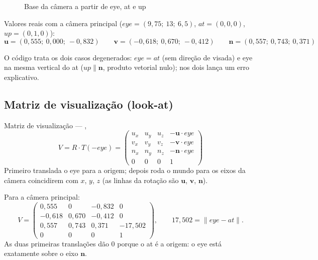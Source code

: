 \documentclass[11pt,a4paper]{article}
\newcommand{\code}[1]{\texttt{\detokenize{#1}}}
\newcommand{\vetor}[1]{\mathbf{#1}}
\newcommand{\norm}[1]{\left\lVert #1 \right\rVert}
\begin{document}
\begin{figure}[H]\centering
\caption{Base da câmera a partir de eye, at e up}
\end{figure}

Valores reais com a câmera principal ($eye = (9{,}75;\ 13;\ 6{,}5)$, $at = (0,0,0)$, $up = (0,1,0)$):
\[
\vetor u = (0{,}555;\ 0{,}000;\ -0{,}832) \qquad
\vetor v = (-0{,}618;\ 0{,}670;\ -0{,}412) \qquad
\vetor n = (0{,}557;\ 0{,}743;\ 0{,}371)
\]

O código trata os dois casos degenerados: $eye = at$ (sem direção de visada) e eye na mesma vertical do
at ($up \parallel \vetor n$, produto vetorial nulo); nos dois lança um erro explicativo.

\subsection{Matriz de visualização (look-at)}

\begin{conceito}{Matriz de visualização — \code{look_at}, \code{math_3d.py:119}}
\[
V = R \cdot T(-eye) =
\begin{pmatrix}
u_x & u_y & u_z & -\vetor u\cdot eye\\
v_x & v_y & v_z & -\vetor v\cdot eye\\
n_x & n_y & n_z & -\vetor n\cdot eye\\
0&0&0&1
\end{pmatrix}
\]
Primeiro translada o eye para a origem; depois roda o mundo para os eixos da câmera coincidirem com
$x$, $y$, $z$ (as linhas da rotação são $\vetor u$, $\vetor v$, $\vetor n$).
\end{conceito}

Para a câmera principal:
\[
V = \begin{pmatrix}
0{,}555 & 0 & -0{,}832 & 0\\
-0{,}618 & 0{,}670 & -0{,}412 & 0\\
0{,}557 & 0{,}743 & 0{,}371 & -17{,}502\\
0&0&0&1
\end{pmatrix},
\qquad 17{,}502 = \norm{eye - at}.
\]
As duas primeiras translações dão 0 porque o at é a origem: o eye está exatamente sobre o eixo $\vetor n$.
\end{document}
